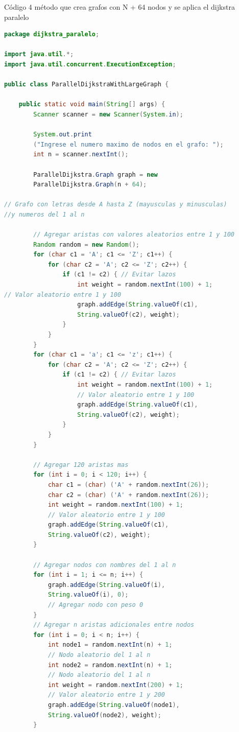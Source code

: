 Código 4 método que crea grafos con N + 64 nodos y se aplica  el dijkstra paralelo
\begin{lstlisting}[language=Java, style=ColorStyle]
package dijkstra_paralelo;

import java.util.*;
import java.util.concurrent.ExecutionException;

public class ParallelDijkstraWithLargeGraph {

    public static void main(String[] args) {
        Scanner scanner = new Scanner(System.in);

        System.out.print
        ("Ingrese el numero maximo de nodos en el grafo: ");
        int n = scanner.nextInt();

        ParallelDijkstra.Graph graph = new 
        ParallelDijkstra.Graph(n + 64); 

// Grafo con letras desde A hasta Z (mayusculas y minusculas) 
//y numeros del 1 al n

        // Agregar aristas con valores aleatorios entre 1 y 100
        Random random = new Random();
        for (char c1 = 'A'; c1 <= 'Z'; c1++) {
            for (char c2 = 'A'; c2 <= 'Z'; c2++) {
                if (c1 != c2) { // Evitar lazos
                    int weight = random.nextInt(100) + 1; 
// Valor aleatorio entre 1 y 100
                    graph.addEdge(String.valueOf(c1),
                    String.valueOf(c2), weight);
                }
            }
        }
        for (char c1 = 'a'; c1 <= 'z'; c1++) {
            for (char c2 = 'A'; c2 <= 'Z'; c2++) {
                if (c1 != c2) { // Evitar lazos
                    int weight = random.nextInt(100) + 1; 
                    // Valor aleatorio entre 1 y 100
                    graph.addEdge(String.valueOf(c1),
                    String.valueOf(c2), weight);
                }
            }
        }

        // Agregar 120 aristas mas
        for (int i = 0; i < 120; i++) {
            char c1 = (char) ('A' + random.nextInt(26));
            char c2 = (char) ('A' + random.nextInt(26));
            int weight = random.nextInt(100) + 1; 
            // Valor aleatorio entre 1 y 100
            graph.addEdge(String.valueOf(c1), 
            String.valueOf(c2), weight);
        }
        
        // Agregar nodos con nombres del 1 al n
        for (int i = 1; i <= n; i++) {
            graph.addEdge(String.valueOf(i), 
            String.valueOf(i), 0); 
            // Agregar nodo con peso 0
        }
        // Agregar n aristas adicionales entre nodos
        for (int i = 0; i < n; i++) {
            int node1 = random.nextInt(n) + 1; 
            // Nodo aleatorio del 1 al n
            int node2 = random.nextInt(n) + 1; 
            // Nodo aleatorio del 1 al n
            int weight = random.nextInt(200) + 1; 
            // Valor aleatorio entre 1 y 200
            graph.addEdge(String.valueOf(node1), 
            String.valueOf(node2), weight);
        }


\end{lstlisting}
